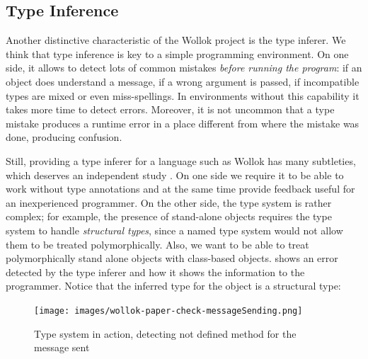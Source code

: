 

\subsection{Type Inference}

Another distinctive characteristic of the Wollok project is the type inferer.
We think that type inference is key to a simple programming environment.
On one side, it allows to detect lots of common mistakes \emph{before running the program}:
if an object does understand a message, if a wrong argument is passed, if incompatible types are mixed or even miss-spellings.
In environments without this capability it takes more time to detect errors.
Moreover, it is not uncommon that a type mistake produces a runtime error in a place different from where the mistake was done, producing confusion.

Still, providing a type inferer for a language such as Wollok has many subtleties, which deserves an independent study \cite{passerini_nicolas_extensible_2014}.
On one side we require it to be able to work without type annotations and at the same time provide feedback useful for an inexperienced programmer.
On the other side, the type system is rather complex;
for example, the presence of stand-alone objects requires the type system to handle \emph{structural types}, since a named type system would not allow them to be treated polymorphically.
Also, we want to be able to treat polymorphically stand alone objects with class-based objects.
 shows an error detected by the type inferer and how it shows the information to the programmer.
Notice that the inferred type for the object  is a structural type: 

\begin{figure}[ht]
    \centering
	\texttt{[image: images/wollok-paper-check-messageSending.png]}
    \caption{Type system in action, detecting not defined method for the message sent}
    \label{fig:check-messageSending.png}
\end{figure}



